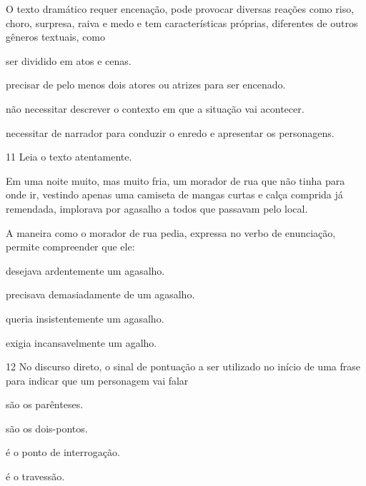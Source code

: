 O texto dramático requer encenação, pode provocar diversas reações como
riso, choro, surpresa, raiva e medo e tem características próprias,
diferentes de outros gêneros textuais, como

\begin{escolha}
\item ser dividido em atos e cenas.

\item precisar de pelo menos dois atores ou atrizes para ser encenado.

\item não necessitar descrever o contexto em que a situação vai acontecer.

\item necessitar de narrador para conduzir o enredo e apresentar os personagens.
\end{escolha}



\num{11} Leia o texto atentamente.

\begin{myquote}
Em uma noite muito, mas muito fria, um morador de rua que não tinha para
onde ir, vestindo apenas uma camiseta de mangas curtas e calça comprida
já remendada, implorava por agasalho a todos que passavam pelo local.

\end{myquote}

A maneira como o morador de rua pedia, expressa no verbo de enunciação,
permite compreender que ele:

\begin{escolha}
\item desejava ardentemente um agasalho.

\item precisava demasiadamente de um agasalho.

\item queria insistentemente um agasalho.

\item exigia incansavelmente um agalho.
\end{escolha}

\num{12} No discurso direto, o sinal de pontuação a ser utilizado no início
de uma frase para indicar que um personagem vai falar

\begin{escolha}
\item são os parênteses.

\item são os dois-pontos.

\item é o ponto de interrogação.

\item é o travessão.
\end{escolha}

